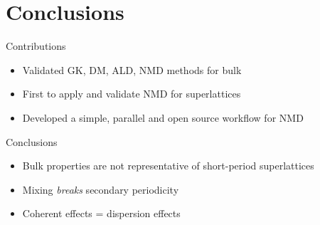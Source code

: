\documentclass{beamer}
\begin{document}
\section{Conclusions}
\begin{frame}{Contributions}
\begin{itemize}
\item Validated GK, DM, ALD, NMD methods for bulk
\item First to apply and validate NMD for superlattices
\item Developed a simple, parallel and open source workflow for NMD
\end{itemize}
\end{frame}

\begin{frame}{Conclusions}
\begin{itemize}
\item Bulk properties are not representative of short-period superlattices
\item Mixing \textit{breaks} secondary periodicity
\item Coherent effects = dispersion effects
\end{itemize}
\end{frame}

\end{document}
